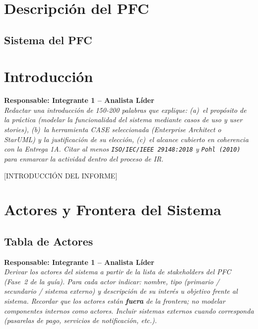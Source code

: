 \documentclass[journal,onecolumn]{IEEEtran}
\newcommand{\guia}[2]{%
  \begin{mdframed}[style=guia]
    \noindent\textbf{Responsable: #1}\\[2pt]
    \textit{#2}
  \end{mdframed}
}
\begin{document}
\tableofcontents
\newpage

\section{Descripción del PFC}

\subsection{Sistema del PFC}


\newpage

\section{Introducción}

\guia{Integrante 1 -- Analista Líder}{%
Redactar una introducción de 150-200 palabras que explique:
(a)~el propósito de la práctica (modelar la funcionalidad del sistema
mediante casos de uso y user stories), (b)~la herramienta CASE seleccionada
(Enterprise Architect o StarUML) y la justificación de su elección,
(c)~el alcance cubierto en coherencia con la Entrega 1A.
Citar al menos \texttt{ISO/IEC/IEEE 29148:2018} y \texttt{Pohl (2010)}
para enmarcar la actividad dentro del proceso de IR.}

[INTRODUCCIÓN DEL INFORME]

\newpage

\section{Actores y Frontera del Sistema}

\subsection{Tabla de Actores}

\guia{Integrante 1 -- Analista Líder}{%
Derivar los actores del sistema a partir de la lista de stakeholders del PFC
(Fase~2 de la guía). Para cada actor indicar: nombre, tipo (primario /
secundario / sistema externo) y descripción de su interés u objetivo frente
al sistema. Recordar que los actores están \textbf{fuera} de la frontera;
no modelar componentes internos como actores. Incluir sistemas externos cuando
corresponda (pasarelas de pago, servicios de notificación, etc.).}
\end{document}
